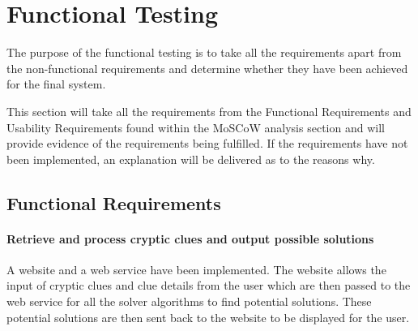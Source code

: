 \section{Functional Testing}
\label{sec:functional_testing}

The purpose of the functional testing is to take all the requirements apart from
the non-functional requirements and determine whether they have been achieved
for the final system. 

This section will take all the requirements from the Functional Requirements and
Usability Requirements found within the MoSCoW analysis section and will provide
evidence of the requirements being fulfilled. If the requirements have not been 
implemented, an explanation will be delivered as to the reasons why.


\subsection{Functional Requirements}
\label{sub:test_func_func}


\paragraph{Retrieve and process cryptic clues and output possible solutions}

A website and a web service have been implemented. The website allows the input
of cryptic clues and clue details from the user which are then passed to the web
service  for all the solver algorithms to find potential solutions. These
potential solutions are then  sent back to the website to be displayed for the
user.

